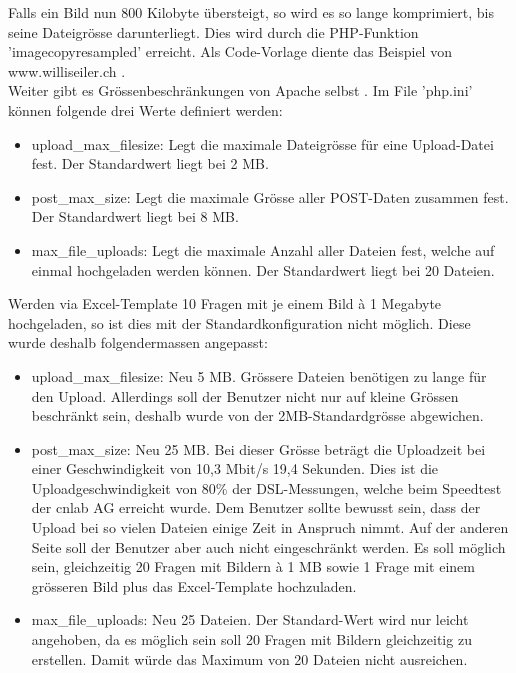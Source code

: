 Falls ein Bild nun 800 Kilobyte übersteigt, so wird es so lange komprimiert, bis seine Dateigrösse darunterliegt. Dies wird durch die PHP-Funktion 'imagecopyresampled' erreicht. Als Code-Vorlage diente das Beispiel von www.williseiler.ch \cite{willis_php}. \\

Weiter gibt es Grössenbeschränkungen von Apache selbst \cite{stackoverflow_largeFilePHP}. Im File 'php.ini' können folgende drei Werte definiert werden:
\begin{itemize}
	\item upload\_max\_filesize: Legt die maximale Dateigrösse für eine Upload-Datei fest. Der Standardwert liegt bei 2 MB.
	\item post\_max\_size: Legt die maximale Grösse aller POST-Daten zusammen fest. Der Standardwert liegt bei 8 MB.
	\item max\_file\_uploads: Legt die maximale Anzahl aller Dateien fest, welche auf einmal hochgeladen werden können. Der Standardwert liegt bei 20 Dateien.
\end{itemize}

Werden via Excel-Template 10 Fragen mit je einem Bild à 1 Megabyte hochgeladen, so ist dies mit der Standardkonfiguration nicht möglich. Diese wurde deshalb folgendermassen angepasst:
\begin{itemize}
	\item upload\_max\_filesize: Neu 5 MB. Grössere Dateien benötigen zu lange für den Upload. Allerdings soll der Benutzer nicht nur auf kleine Grössen beschränkt sein, deshalb wurde von der 2MB-Standardgrösse abgewichen.
	\item post\_max\_size: Neu 25 MB. Bei dieser Grösse beträgt die Uploadzeit bei einer Geschwindigkeit von 10,3 Mbit/s 19,4 Sekunden. Dies ist die Uploadgeschwindigkeit von 80\% der DSL-Messungen, welche beim Speedtest der cnlab AG \cite{cnlab_speedtest} erreicht wurde. Dem Benutzer sollte bewusst sein, dass der Upload bei so vielen Dateien einige Zeit in Anspruch nimmt.
	Auf der anderen Seite soll der Benutzer aber auch nicht eingeschränkt werden. Es soll möglich sein, gleichzeitig 20 Fragen mit Bildern à 1 MB sowie 1 Frage mit einem grösseren Bild plus das Excel-Template hochzuladen.
	\item max\_file\_uploads: Neu 25 Dateien. Der Standard-Wert wird nur leicht angehoben, da es möglich sein soll 20 Fragen mit Bildern gleichzeitig zu erstellen. Damit würde das Maximum von 20 Dateien nicht ausreichen.
\end{itemize}

